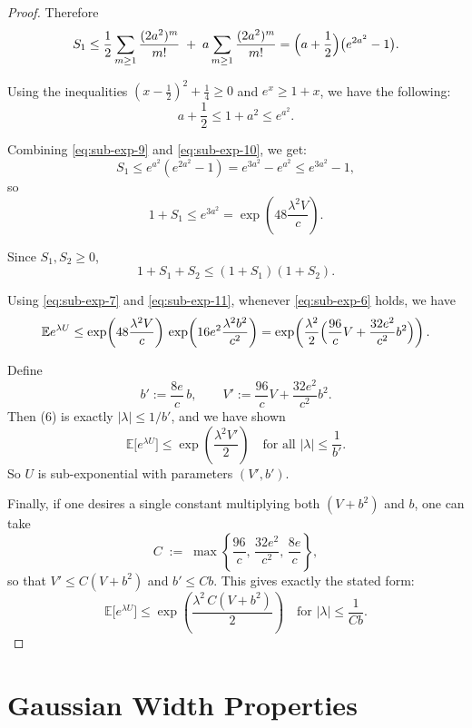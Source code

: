\begin{proof}
Therefore
\begin{equation}\label{eq:sub-exp-9}
    S_1
\le \frac12\sum_{m\ge 1}\frac{(2a^2)^m}{m!}
\;+\; a\sum_{m\ge 1}\frac{(2a^2)^m}{m!}
= \Bigl(a+\frac12\Bigr)\bigl(e^{2a^2}-1\bigr).
\end{equation}


Using the inequalities $(x-\tfrac12)^2+\tfrac14\ge 0$ and $e^x\ge 1+x$, we have the following: 
\begin{equation}\label{eq:sub-exp-10}
    a+\frac12 \le 1+a^2 \le e^{a^2}.
\end{equation}


Combining \eqref{eq:sub-exp-9} and \eqref{eq:sub-exp-10}, we get:
\[
S_1 \le e^{a^2}(e^{2a^2}-1)=e^{3a^2}-e^{a^2}\le e^{3a^2}-1,
\]
so
\begin{equation}\label{eq:sub-exp-11}
    1+S_1 \le e^{3a^2}=\exp\!\left(48\frac{\lambda^2 V}{c}\right).
\end{equation}


Since $S_1,S_2\ge 0$,
\[
1+S_1+S_2 \le (1+S_1)(1+S_2).
\]

Using \eqref{eq:sub-exp-7} and \eqref{eq:sub-exp-11}, whenever \eqref{eq:sub-exp-6} holds, we have
\[
\mathbb E e^{\lambda U}
\le \exp\!\left(48\frac{\lambda^2 V}{c}\right)\,
\exp\!\left(16e^2\frac{\lambda^2 b^2}{c^2}\right)
= \exp\!\left(\frac{\lambda^2}{2}\Bigl(\frac{96}{c}V+\frac{32e^2}{c^2}b^2\Bigr)\right).
\]

Define
\[
b' := \frac{8e}{c}\,b,
\qquad
V' := \frac{96}{c}V+\frac{32e^2}{c^2}b^2.
\]
Then (6) is exactly $|\lambda|\le 1/b'$, and we have shown
\[
\mathbb E\bigl[e^{\lambda U}\bigr] \le \exp\!\left(\frac{\lambda^2 V'}{2}\right)
\quad\text{for all }|\lambda|\le \frac{1}{b'}.
\]
So $U$ is sub-exponential with parameters $(V',b')$.

Finally, if one desires a single constant multiplying both $(V+b^2)$ and $b$, one can take
\[
C \;:=\; \max\!\left\{\frac{96}{c},\,\frac{32e^2}{c^2},\,\frac{8e}{c}\right\},
\]
so that $V' \le C(V+b^2)$ and $b'\le Cb$. This gives exactly the stated form:
\[
\mathbb E\bigl[e^{\lambda U}\bigr] \le \exp\!\left(\frac{\lambda^2\,C(V+b^2)}{2}\right)
\quad\text{for }|\lambda|\le \frac{1}{Cb}.
\]
\end{proof}
\section{Gaussian Width Properties}\label{appendix:gaussian-width-properties}

